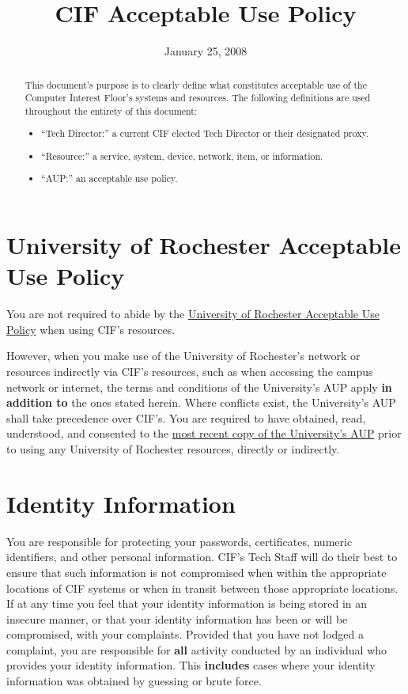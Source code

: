 \documentclass[12pt]{article}
\title{CIF Acceptable Use Policy}
\date{January 25, 2008}
\newcommand{\rochesterAUP}[1]{\href{http://www.resnet.rochester.edu/getstarted/aup.php}{#1}}
\begin{document}
\maketitle

\begin{abstract}
This document's purpose is to clearly define what constitutes acceptable use of the Computer Interest Floor's systems and resources. The following definitions are used throughout the entirety of this document:

\begin{itemize}
	\item ``Tech Director:'' a current CIF elected Tech Director or their designated proxy.
	\item ``Resource:'' a service, system, device, network, item, or information.
	\item ``AUP:'' an acceptable use policy.
\end{itemize}
\end{abstract}

\section{University of Rochester Acceptable Use Policy} %
\label{sec:rochester-aup}

You are not required to abide by the \rochesterAUP{University of Rochester Acceptable Use Policy} when using CIF's resources.

However, when you make use of the University of Rochester's network or resources indirectly via CIF's resources, such as when accessing the campus network or internet, the terms and conditions of the University's AUP apply \textbf{in addition to} the ones stated herein. Where conflicts exist, the University's AUP shall take precedence over CIF's. You are required to have obtained, read, understood, and consented to the \rochesterAUP{most recent copy of the University's AUP} prior to using any University of Rochester resources, directly or indirectly.


\section{Identity Information} %

You are responsible for protecting your passwords, certificates, numeric identifiers, and other personal information. CIF's Tech Staff will do their best to ensure that such information is not compromised when within the appropriate locations of CIF systems or when in transit between those appropriate locations. If at any time you feel that your identity information is being stored in an insecure manner, or that your identity information has been or will be compromised,  with your complaints. Provided that you have not lodged a complaint, you are responsible for \textbf{all} activity conducted by an individual who provides your identity information. This \textbf{includes} cases where your identity information was obtained by guessing or brute force.
\end{document}
